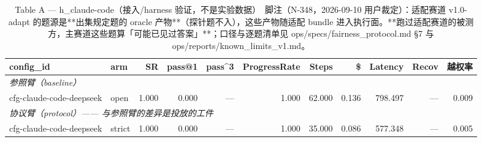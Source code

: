 \begin{table}[t]
\centering
\caption{Table A — h\_claude-code（接入/harness 验证，不是实验数据）　脚注（N-348，2026-09-10 用户裁定）：适配赛道 v1.0-adapt 的题源是**出集规定题的 oracle 产物**（探针题不入），这些产物随适配 bundle 进入执行面。**跑过适配赛道的被测方，主赛道这些题算「可能已见过答案」**；口径与逐题清单见 ops/specs/fairness\_protocol.md §7 与 ops/reports/known\_limits\_v1.md。}
\label{tab:a-h_claude-code}
\begin{tabular}{llrrrrrrrrr}
\toprule
config\_id & arm & SR & pass@1 & pass\^{}3 & ProgressRate & Steps & \$ & Latency & Recov & 越权率 \\
\midrule
\multicolumn{11}{l}{\textit{参照臂（baseline）}} \\
cfg-claude-code-deepseek & open & 1.000 & 0.000 & --- & 1.000 & 62.000 & 0.136 & 798.497 & --- & 0.009 \\
\midrule
\multicolumn{11}{l}{\textit{协议臂（protocol）—— 与参照臂的差异是投放的工件}} \\
cfg-claude-code-deepseek & strict & 1.000 & 0.000 & --- & 1.000 & 35.000 & 0.086 & 577.348 & --- & 0.005 \\
\bottomrule
\end{tabular}
\end{table}

